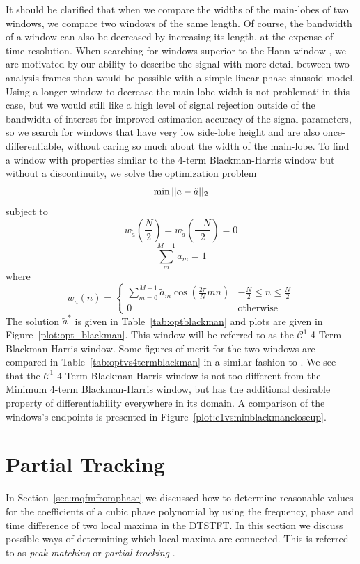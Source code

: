 It should be clarified that when we compare the widths of the main-lobes of two
windows, we compare two windows of the same length. Of course, the bandwidth of
a window can also be decreased by increasing its length, at the expense of
time-resolution. When searching for windows superior to the Hann window , we are
motivated by our ability to describe the signal with more detail between two
analysis frames than would be possible with a simple linear-phase sinusoid
model. Using a longer window to decrease the main-lobe width is not problemati
in this case, but we would still like a high level of signal rejection outside
of the bandwidth of interest for improved estimation accuracy of the signal
parameters, so we search for windows that have very low side-lobe height and are
also once-differentiable, without caring so much about the width of the
main-lobe. To find a window with properties similar to the 4-term
Blackman-Harris window but without a discontinuity, we solve the optimization
problem
\[
        \min||a-\tilde{a}||_2 \\
\]
subject to
\[
        w_{\tilde{a}} \left( \frac{N}{2} \right)
            = w_{\tilde{a}} \left( \frac{-N}{2} \right) = 0
\]
\[
        \sum_{m}^{M-1} a_{m} = 1
\]
where
\[
    w_{\tilde{a}}(n) = \begin{cases}
        \sum_{m=0}^{M-1}\tilde{a}_{m}\cos \left( \frac{2\pi}{N}mn \right) & -\frac{N}{2} \leq n
        \leq \frac{N}{2} \\
        0 & \text{otherwise}
    \end{cases}
\]
The solution $\tilde{a}^{\ast}$ is given in Table~\ref{tab:optblackman} and
plots are given in Figure~\ref{plot:opt_blackman}. This window will be referred
to as the $\mathcal{C}^{1}$ 4-Term Blackman-Harris window. Some figures of merit
for the two windows are compared in Table~\ref{tab:optvs4termblackman} in a similar
fashion to \cite{harris1978use}. We see
that the $\mathcal{C}^{1}$ 4-Term Blackman-Harris window is not too different
from the Minimum 4-term Blackman-Harris window, but has the additional
desirable property of differentiability everywhere in its domain. A comparison
of the windows's endpoints is presented in
Figure~\ref{plot:c1vsminblackmancloseup}.

\section{Partial Tracking\label{sec:partialtracking}}

In Section~\ref{sec:mqfmfromphase} we discussed how to determine reasonable
values for the coefficients of a cubic phase polynomial by using the frequency,
phase and time difference of two local maxima in the DTSTFT. In this section we
discuss possible ways of determining which local maxima are connected. This is
referred to as \textit{peak matching} \cite{mcaulay1986speech}
or \textit{partial tracking} \cite{smith1987parshl} \cite{depalle1993tracking}.

